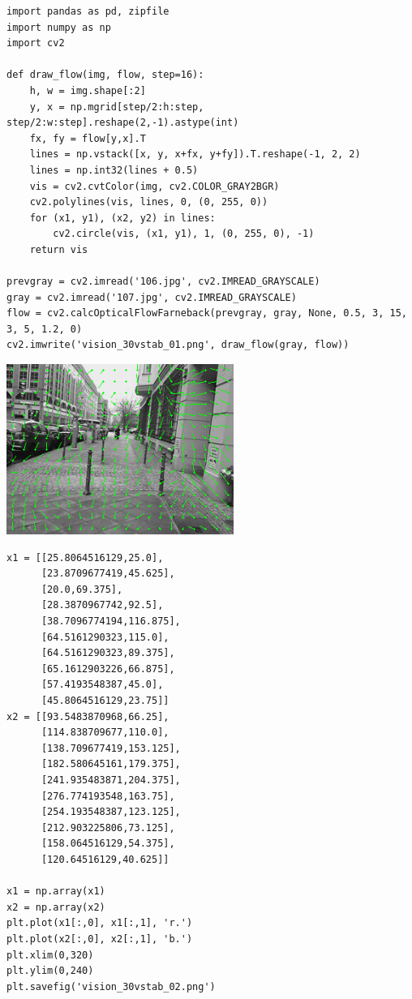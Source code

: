 \documentclass[12pt,fleqn]{article}\usepackage{../../common}
\begin{document}
\begin{verbatim}
import pandas as pd, zipfile
import numpy as np
import cv2

def draw_flow(img, flow, step=16):
    h, w = img.shape[:2]
    y, x = np.mgrid[step/2:h:step, step/2:w:step].reshape(2,-1).astype(int)
    fx, fy = flow[y,x].T
    lines = np.vstack([x, y, x+fx, y+fy]).T.reshape(-1, 2, 2)
    lines = np.int32(lines + 0.5)
    vis = cv2.cvtColor(img, cv2.COLOR_GRAY2BGR)
    cv2.polylines(vis, lines, 0, (0, 255, 0))
    for (x1, y1), (x2, y2) in lines:
        cv2.circle(vis, (x1, y1), 1, (0, 255, 0), -1)
    return vis

prevgray = cv2.imread('106.jpg', cv2.IMREAD_GRAYSCALE)
gray = cv2.imread('107.jpg', cv2.IMREAD_GRAYSCALE)
flow = cv2.calcOpticalFlowFarneback(prevgray, gray, None, 0.5, 3, 15, 3, 5, 1.2, 0)
cv2.imwrite('vision_30vstab_01.png', draw_flow(gray, flow))
\end{verbatim}

\includegraphics[width=20em]{vision_30vstab_01.png}

\begin{verbatim}
x1 = [[25.8064516129,25.0],
      [23.8709677419,45.625],
      [20.0,69.375],
      [28.3870967742,92.5],
      [38.7096774194,116.875],
      [64.5161290323,115.0],
      [64.5161290323,89.375],
      [65.1612903226,66.875],
      [57.4193548387,45.0],
      [45.8064516129,23.75]]
x2 = [[93.5483870968,66.25],
      [114.838709677,110.0],
      [138.709677419,153.125],
      [182.580645161,179.375],
      [241.935483871,204.375],
      [276.774193548,163.75],
      [254.193548387,123.125],
      [212.903225806,73.125],
      [158.064516129,54.375],
      [120.64516129,40.625]]

x1 = np.array(x1)
x2 = np.array(x2)
plt.plot(x1[:,0], x1[:,1], 'r.')
plt.plot(x2[:,0], x2[:,1], 'b.')
plt.xlim(0,320)
plt.ylim(0,240)
plt.savefig('vision_30vstab_02.png')
\end{verbatim}
\end{document}
